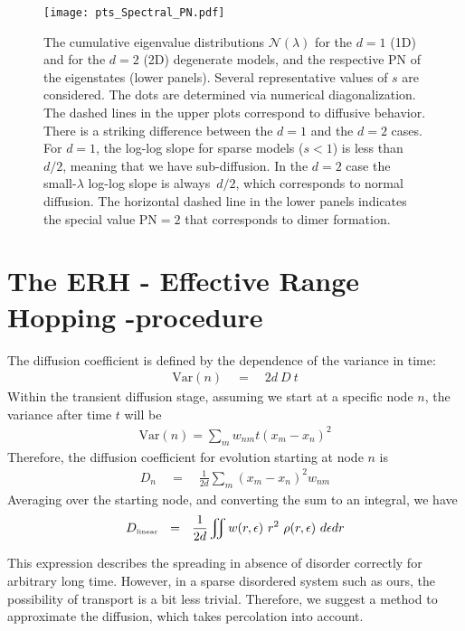 \begin{figure}
\texttt{[image: pts\_Spectral\_PN.pdf]}

\caption{ 
The cumulative eigenvalue distributions $\mathcal{N}(\lambda)$ 
for the $d{=}1$ (1D) and for the $d{=}2$ (2D) degenerate models, 
and the respective PN of the eigenstates (lower panels).
Several representative values of $s$ are considered.
% 
The dots are determined via numerical diagonalization. 
The dashed lines in the upper plots correspond to diffusive behavior.  
%
There is a striking difference between the $d{=}1$ and the $d{=}2$ cases. 
For $d{=}1$, the log-log slope for sparse models ($s<1$) is less than~$d/2$, 
meaning that we have sub-diffusion. In the $d{=}2$ case the small-$\lambda$ log-log slope 
is always~$d/2$, which corresponds to normal diffusion.
%
The horizontal dashed line in the lower panels indicates 
the special value PN$=2$ that corresponds to dimer formation.
}
\label{fig:spectral}
\end{figure}

\section{The ERH - Effective Range Hopping -procedure}

The diffusion coefficient is defined by the dependence
of the variance in time:
%
\begin{align}
\textrm{Var}(n) \quad =\quad 2d\ D\ t
\end{align}
%
Within the transient diffusion stage,
assuming we start at a specific node $n$, the variance after time
$t$ will be
%
\begin{align}
\textrm{Var}(n) = \sum_m w_{nm} t (x_m-x_n)^2
\end{align}
Therefore, the diffusion coefficient for evolution 
starting at node $n$ is
%
\begin{align}
D_n \quad=\quad \frac{1}{2d}\sum_m (x_m-x_n)^2 w_{nm}
\end{align}
%
Averaging over the starting node, and converting the sum to an integral,
we have
%
\begin{align}\label{eq:linear_D}
D_{\tbox{linear}}  \ \ = \ \ \frac{1}{2d}\iint w(r,\epsilon) \ r^2  \ \rho(r,\epsilon) \ d\epsilon dr 
\end{align}
%

This expression describes the spreading in absence of disorder correctly
for arbitrary long time. However, in a sparse disordered system such as ours,
the possibility of transport is a bit less trivial. Therefore, we suggest
a method to approximate the diffusion, which takes percolation into account.


